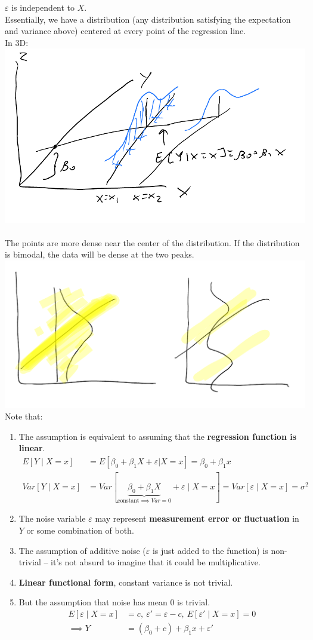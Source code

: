 \documentclass[12 pt]{article}
\begin{document}
$\varepsilon$ is independent to $X$.
\\ Essentially, we have a distribution (any distribution satisfying
the expectation and variance above) centered at every point
of the regression line.
\\ In 3D:
\\\includegraphics[width=.5\textwidth]{7.pdf}
\\
\\ The points are more dense near the center of the distribution. If
the distribution is bimodal, the data will be dense at the two peaks.
\\ \includegraphics[width=.9\textwidth]{8.pdf}
\\
Note that:
\begin{enumerate}
\item The assumption is equivalent to assuming that the
  \textbf{regression function is linear}.
  \begin{align*}
  E[Y \mid X = x] & = E [\beta_0 + \beta_1 X + \varepsilon | X = x] =
                    \beta_0 + \beta_1x
    \\ Var[Y \mid X = x] & = Var[\underbrace{\beta_0+\beta_1X}_{\text{constant} \implies Var = 0} + \varepsilon \mid X = x ] = Var[\varepsilon \mid X = x] = \sigma^2
  \end{align*}
\item The noise variable $\varepsilon$ may represent
  \textbf{measurement error or fluctuation} in $Y$ or some combination
  of both.
\item The assumption of additive noise ($\varepsilon$ is just added to
  the function) is non-trivial \hbox{--} it's
  not absurd to imagine that it could be multiplicative.
\item \textbf{Linear functional form}, constant variance is not
  trivial.
\item But the assumption that noise has mean $0$ is trivial.
  \begin{align*}
    E [\varepsilon \mid X = x] & = c,\ \varepsilon' = \varepsilon - c,\ E[\varepsilon' \mid X = x] = 0
    \\ \implies Y & = (\beta_0 + c) + \beta_1 x + \varepsilon'
  \end{align*}
\end{enumerate}
\end{document}
